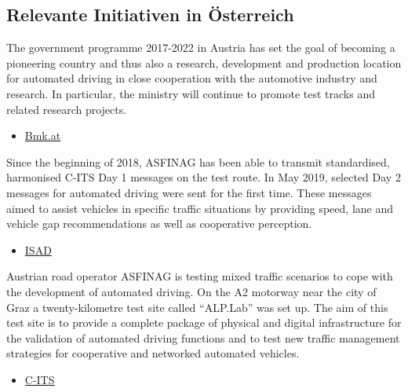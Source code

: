 \documentclass[
]{book}
\providecommand{\tightlist}{%
  \setlength{\itemsep}{0pt}\setlength{\parskip}{0pt}}
\begin{document}
\hypertarget{relevante-initiativen-in-uxf6sterreich-19}{%
\subsection*{Relevante Initiativen in Österreich}\label{relevante-initiativen-in-uxf6sterreich-19}}

The government programme 2017-2022 in Austria has set the goal of becoming a pioneering country and thus also a research, development and production location for automated driving in close cooperation with the automotive industry and research. In particular, the ministry will continue to promote test tracks and related research projects.

\begin{itemize}
\tightlist
\item
  \href{https://www.bmk.gv.at/themen/mobilitaet/alternative_verkehrskonzepte/automatisiertesFahren/aktionsplan.html}{Bmk.at}
\end{itemize}

Since the beginning of 2018, ASFINAG has been able to transmit standardised, harmonised C-ITS Day 1 messages on the test route. In May 2019, selected Day 2 messages for automated driving were sent for the first time. These messages aimed to assist vehicles in specific traffic situations by providing speed, lane and vehicle gap recommendations as well as cooperative perception.

\begin{itemize}
\tightlist
\item
  \href{https://www.researchgate.net/publication/339339109_Infrastructure_support_for_automated_driving_Further_enhancements_on_the_ISAD_classes_in_Austria}{ISAD}
\end{itemize}

Austrian road operator ASFINAG is testing mixed traffic scenarios to cope with the development of automated driving. On the A2 motorway near the city of Graz a twenty-kilometre test site called ``ALP.Lab'' was set up. The aim of this test site is to provide a complete package of physical and digital infrastructure for the validation of automated driving functions and to test new traffic management strategies for cooperative and networked automated vehicles.

\begin{itemize}
\tightlist
\item
  \href{https://www.researchgate.net/publication/339353309_Road_infrastructure_support_levels_for_automated_driving}{C-ITS}
\end{itemize}
\end{document}
